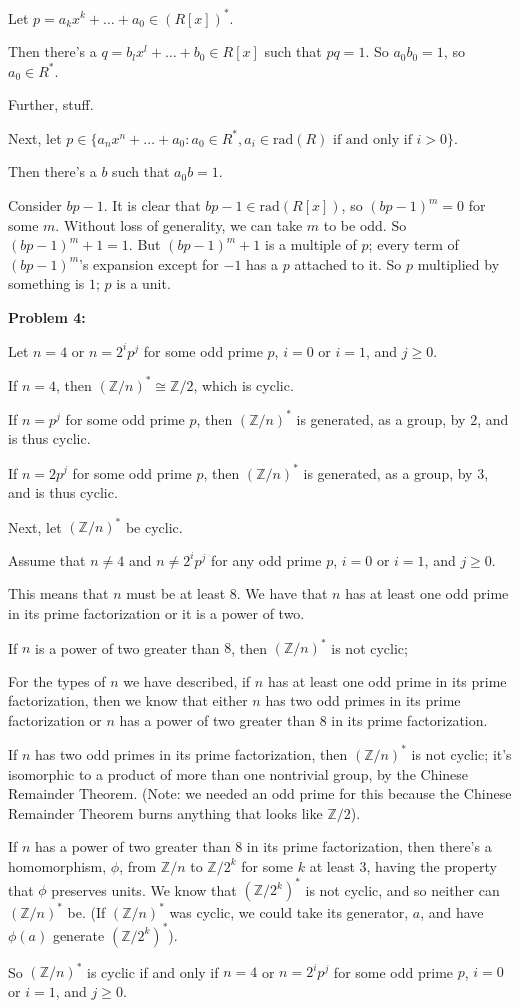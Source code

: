 \documentclass[a4paper,12pt]{article}
\newcommand{\tab}{\hspace{4mm}} %
\newcommand{\shunt}{\vspace{20mm}}
\newcommand{\Z}{\mathbb{Z}}
\begin{document}
Let $p =a_kx^k+ \ldots +a_0\in (R[x])^*$.

\tab Then there's a $q = b_lx^l+ \ldots +b_0 \in R[x]$ such that $pq=1$. So $a_0b_0=1$, so $a_0 \in R^*$.

\tab Further, stuff.

Next, let $p \in \{a_nx^n + \ldots + a_0: a_0 \in R^*, a_i \in \text{rad}(R) \text{ if and only if } i >0\}$.

\tab Then there's a $b$ such that $a_0b=1$.

\tab Consider $bp-1$. It is clear that $bp-1 \in \text{rad}(R[x])$, so $(bp-1)^m=0$ for some $m$. Without loss of generality, we can take $m$ to be odd. So $(bp-1)^m+1=1$. But $(bp-1)^m + 1$ is a multiple of $p$; every term of $(bp-1)^m$'s expansion except for $-1$ has a $p$ attached to it. So $p$ multiplied by something is $1$; $p$ is a unit.

\shunt

{\bf Problem 4:}

Let $n=4$ or $n=2^ip^j$ for some odd prime $p$, $i=0$ or $i=1$, and $j \geq 0$.

\tab If $n=4$, then $(\Z/n)^* \cong \Z/2$, which is cyclic.

\tab If $n=p^j$ for some odd prime $p$, then $(\Z/n)^*$ is generated, as a group, by $2$, and is thus cyclic. %

\tab If $n=2p^j$ for some odd prime $p$, then $(\Z/n)^*$ is generated, as a group, by $3$, and is thus cyclic. %

Next, let $(\Z/n)^*$ be cyclic.

\tab Assume that $n \neq 4$ and $n \neq 2^ip^j$ for any odd prime $p$, $i=0$ or $i=1$, and $j \geq 0$.

\tab This means that $n$ must be at least $8$. We have that $n$ has at least one odd prime in its prime factorization or it is a power of two. 

\tab If $n$ is a power of two greater than $8$, then $(\Z/n)^*$ is not cyclic; %

\tab For the types of $n$ we have described, if $n$ has at least one odd prime in its prime factorization, then we know that either $n$ has two odd primes in its prime factorization or $n$ has a power of two greater than $8$ in its prime factorization.

\tab If $n$ has two odd primes in its prime factorization, then $(\Z/n)^*$ is not cyclic; it's isomorphic to a product of more than one nontrivial group, by the Chinese Remainder Theorem. (Note: we needed an odd prime for this because the Chinese Remainder Theorem burns anything that looks like $\Z/2$). 

\tab If $n$ has a power of two greater than $8$ in its prime factorization, then there's a homomorphism, $\phi$, from $\Z/n$ to $\Z/2^k$ for some $k$ at least $3$, having the property that $\phi$ preserves units. We know that $(\Z/2^k)^*$ is not cyclic, and so neither can $(\Z/n)^*$ be. (If $(\Z/n)^*$ was cyclic, we could take its generator, $a$, and have $\phi(a)$ generate $(\Z/2^k)^*$).

So $(\Z/n)^*$ is cyclic if and only if $n=4$ or $n=2^ip^j$ for some odd prime $p$, $i=0$ or $i=1$, and $j \geq 0$.

\shunt
\end{document}

